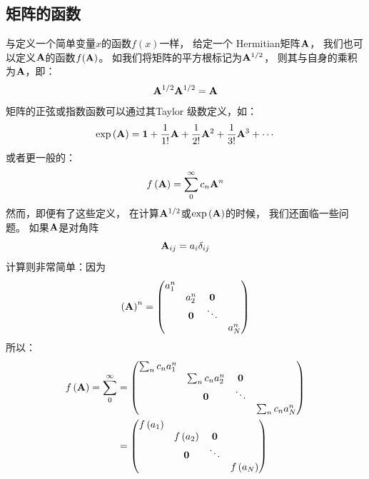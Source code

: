 \subsection{矩阵的函数}
\label{sec:1.1.7}
与定义一个简单变量$x$的函数$f(x)$一样，
给定一个 Hermitian矩阵$\mathbf{A}$，
我们也可以定义$\mathbf{A}$的函数$f(\mathbf{A})$。
如我们将矩阵的平方根标记为$\mathbf{A}^{1/2}$，
则其与自身的乘积为$\mathbf{A}$，即：
\begin{equation}
 \mathbf{A}^{1/2}\mathbf{A}^{1/2} = \mathbf{A}
 \label{eq:1.108}
\end{equation} 
矩阵的正弦或指数函数可以通过其Taylor 级数定义，如：
\[\exp\left(\mathbf{A}\right) = \mathbf{1} + \frac{1}{1!}\mathbf{A} + \frac{1}{2!}\mathbf{A}^2 + \frac{1}{3!}\mathbf{A}^3 + \cdots\]
或者更一般的：
\begin{equation}
 f\left(\mathbf{A}\right) = \sum_0^{\infty}c_n \mathbf{A}^n
 \label{eq:1.109}
\end{equation}
然而，即便有了这些定义，
在计算$\mathbf{A}^{1/2}$或$\exp\left(\mathbf{A}\right)$的时候，
我们还面临一些问题。
如果$\mathbf{A}$是对角阵
\[\mathbf{A}_{ij} = a_i\delta_{ij}\]
计算则非常简单：因为
\begin{equation}
 \left(\mathbf{A}\right)^n = \begin{pmatrix}
     a_1^n &               &      & \\
                    &a_2^n &\mathbf{0} & \\
           &\mathbf{0} &\ddots & \\
           &               &                &a_N^n
 \end{pmatrix}
 \label{eq:1.110}
\end{equation}
所以：
\begin{equation}
 \begin{split}
     f\left(\mathbf{A}\right) = \sum_0^{\infty} &= \begin{pmatrix}
      \sum_n c_n a_1^n &               &      & \\
                     &\sum_n c_n a_2^n &\mathbf{0} & \\
               &\mathbf{0} &\ddots & \\
               &               &                &\sum_n c_n a_N^n
     \end{pmatrix} \\
     &= \begin{pmatrix}
      f\left(a_1\right) &               &      & \\
                     &f\left(a_2\right) &\mathbf{0} & \\
               &\mathbf{0} &\ddots & \\
               &               &                &f\left(a_N\right)
     \end{pmatrix}
 \end{split}
 \label{eq:1.111}
\end{equation}
